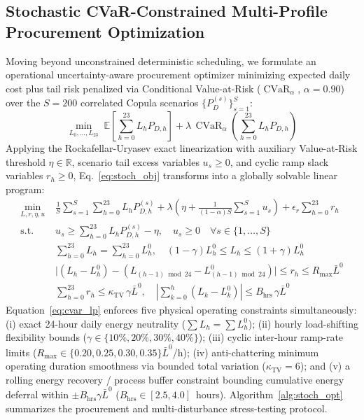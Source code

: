 \documentclass[runningheads,a4paper]{llncs}
\begin{document}
\subsection{Stochastic CVaR-Constrained Multi-Profile Procurement Optimization}
Moving beyond unconstrained deterministic scheduling, we formulate an operational uncertainty-aware procurement optimizer minimizing expected daily cost plus tail risk penalized via Conditional Value-at-Risk ($\operatorname{CVaR}_{\alpha}$, $\alpha = 0.90$) over the $S=200$ correlated Copula scenarios $\{P_D^{(s)}\}_{s=1}^{S}$:
\begin{equation}
\min_{L_0, \dots, L_{23}} \; \mathbb{E}\!\left[\sum_{h=0}^{23} L_h P_{D,h}\right] + \lambda \, \operatorname{CVaR}_{\alpha}\!\left(\sum_{h=0}^{23} L_h P_{D,h}\right)
\label{eq:stoch_obj}
\end{equation}
Applying the Rockafellar-Uryasev exact linearization \cite{rockafellar2000optimization} with auxiliary Value-at-Risk threshold $\eta \in \mathbb{R}$, scenario tail excess variables $u_s \ge 0$, and cyclic ramp slack variables $r_h \ge 0$, Eq.~\ref{eq:stoch_obj} transforms into a globally solvable linear program:
\begin{equation}
\begin{aligned}
\min_{L, r, \eta, u} \; & \frac{1}{S}\sum_{s=1}^{S}\sum_{h=0}^{23} L_h P_{D,h}^{(s)} + \lambda\!\left(\eta + \frac{1}{(1-\alpha)S}\sum_{s=1}^{S} u_s\right) + \epsilon_r \sum_{h=0}^{23} r_h \\
\text{s.t.} \; & u_s \ge \sum_{h=0}^{23} L_h P_{D,h}^{(s)} - \eta, \quad u_s \ge 0 \quad \forall s \in \{1,\dots,S\} \\
& \sum_{h=0}^{23} L_h = \sum_{h=0}^{23} L_h^0, \quad (1-\gamma)L_h^0 \le L_h \le (1+\gamma)L_h^0 \\
& \big|(L_h - L_h^0) - (L_{(h-1)\bmod 24} - L_{(h-1)\bmod 24}^0)\big| \le r_h \le R_{\max}\bar{L}^0 \\
& \sum_{h=0}^{23} r_h \le \kappa_{\text{TV}}\,\gamma\bar{L}^0, \quad \left|\sum_{k=0}^{h}(L_k - L_k^0)\right| \le B_{\text{hrs}}\,\gamma\bar{L}^0
\end{aligned}
\label{eq:cvar_lp}
\end{equation}
Equation~\ref{eq:cvar_lp} enforces five physical operating constraints simultaneously: (i) exact 24-hour daily energy neutrality ($\sum L_h = \sum L_h^0$); (ii) hourly load-shifting flexibility bounds ($\gamma \in \{10\%, 20\%, 30\%, 40\%\}$); (iii) cyclic inter-hour ramp-rate limits ($R_{\max} \in \{0.20, 0.25, 0.30, 0.35\}\bar{L}^0$/h); (iv) anti-chattering minimum operating duration smoothness via bounded total variation ($\kappa_{\text{TV}} = 6$); and (v) a rolling energy recovery / process buffer constraint bounding cumulative energy deferral within $\pm B_{\text{hrs}}\gamma\bar{L}^0$ ($B_{\text{hrs}} \in [2.5, 4.0]$~hours). Algorithm~\ref{alg:stoch_opt} summarizes the procurement and multi-disturbance stress-testing protocol.
\end{document}
